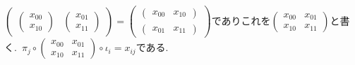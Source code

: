 \begin{definition}
\begin{center}
\end{center}
$\begin{pmatrix} {\begin{pmatrix} x_{00} \\ x_{10} \end{pmatrix}} & {\begin{pmatrix} x_{01} \\ x_{11} \end{pmatrix}} \end{pmatrix} = \begin{pmatrix} {\begin{pmatrix} x_{00} & x_{10} \end{pmatrix}} \\ {\begin{pmatrix} x_{01} & x_{11} \end{pmatrix}} \end{pmatrix}$でありこれを$\begin{pmatrix} x_{00} & x_{01} \\ x_{10} & x_{11} \end{pmatrix}$と書く.\
$\pi_j \circ \begin{pmatrix} x_{00} & x_{01} \\ x_{10} & x_{11} \end{pmatrix} \circ \iota_i = x_{ij}$である.
\end{definition}
